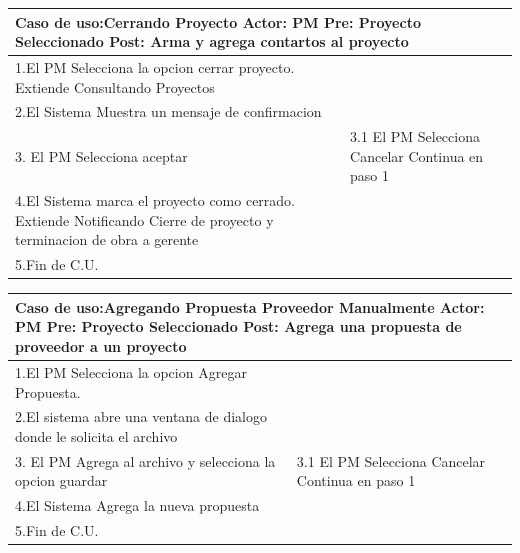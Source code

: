 \begin{longtable}{|p{}|p{}|}
    \hline
    \multicolumn{2}{|p{16cm}|}{
        \textbf{Caso de uso:}Cerrando Proyecto \newline
        \textbf{Actor:} PM\newline
        \textbf{Pre: }Proyecto Seleccionado\newline
        \textbf{Post:} Arma y agrega contartos al proyecto
    }\\
    \hline
    1.El PM Selecciona la opcion cerrar proyecto. Extiende Consultando Proyectos & \\
    \hline
    2.El Sistema Muestra un mensaje de confirmacion& \\
    \hline
    3. El PM Selecciona aceptar & 3.1 El PM Selecciona Cancelar \newline 3.2 Continua en paso 1\\
    \hline
    4.El Sistema marca el proyecto como cerrado. Extiende Notificando Cierre de proyecto y terminacion de obra a gerente &\\
    \hline
    5.Fin de C.U. &\\
    \hline
\end{longtable}

\begin{longtable}{|p{}|p{}|}
    \hline
    \multicolumn{2}{|p{16cm}|}{
        \textbf{Caso de uso:}Agregando Propuesta Proveedor Manualmente \newline
        \textbf{Actor:} PM\newline
        \textbf{Pre: }Proyecto Seleccionado\newline
        \textbf{Post:} Agrega una propuesta de proveedor a un proyecto
    }\\
    \hline
    1.El PM Selecciona la opcion Agregar Propuesta.& \\
    \hline
    2.El sistema abre una ventana de dialogo donde le solicita el archivo& \\
    \hline
    3. El PM Agrega al archivo y selecciona la opcion guardar & 3.1 El PM Selecciona Cancelar \newline 3.2 Continua en paso 1\\
    \hline
    4.El Sistema Agrega la nueva propuesta&\\
    \hline
    5.Fin de C.U. &\\
    \hline
\end{longtable}

